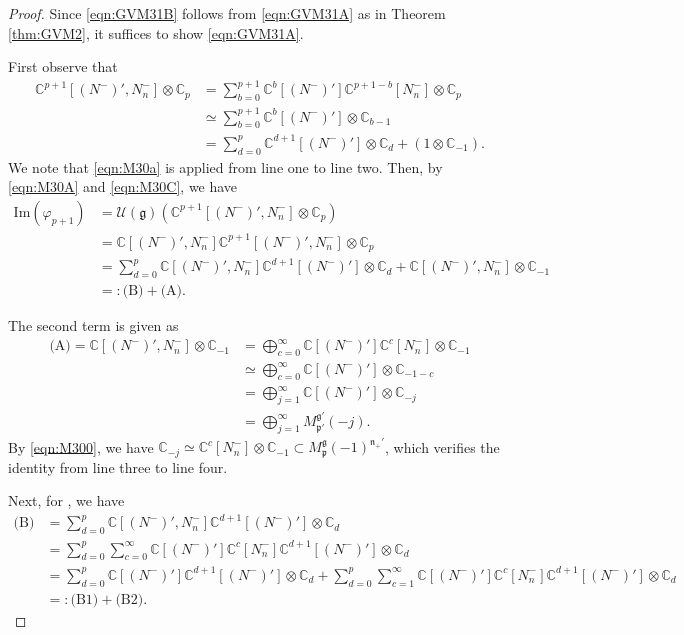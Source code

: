 \documentclass[reqno,11pt]{amsart}
\theoremstyle{remark}
\theoremstyle{definition}
\numberwithin{equation}{section}
\newcommand{\fg}{{\mathfrak g}}
\newcommand{\fn}{{\mathfrak n}}
\newcommand{\fp}{{\mathfrak p}}
\newcommand{\C}{\mathbb{C}}
\newcommand{\Cal}{\mathcal}
\renewcommand{\Im}{\mathrm{Im}}
\newcommand{\Mp}{M^{\fg}_{\fp}}
\newcommand{\Mpp}{M^{\fg'}_{\fp'}}
\newcommand{\Np}{(N^-)'}
\newcommand{\Nn}{N_n^-}
\begin{document}
\begin{proof}
Since \eqref{eqn:GVM31B} follows from \eqref{eqn:GVM31A}
as in Theorem \ref{thm:GVM2}, it suffices to show \eqref{eqn:GVM31A}.

First observe that
\begin{align}
\C^{p+1}[(N^-)', N_n^-]\otimes \C_p
&=\sum_{b=0}^{p+1}\C^b[\Np]\C^{p+1-b}[\Nn]\otimes \C_p \nonumber \\
&\simeq \sum_{b=0}^{p+1}\C^b[\Np]\otimes \C_{b-1} \nonumber \\
&=\sum_{d=0}^p \C^{d+1}[\Np] \otimes \C_d + (1\otimes \C_{-1}).
\label{eqn:M30C}
\end{align}
We note that \eqref{eqn:M30a} is applied from line one to line two.
Then, by \eqref{eqn:M30A} and \eqref{eqn:M30C}, we have
\begin{align}
\Im(\varphi_{p+1})
&=\Cal{U}(\fg)\left(\C^{p+1}[(N^-)', N_n^-] \otimes \C_p\right) \nonumber \\
&=\C[\Np,\Nn]\C^{p+1}[(N^-)', N_n^-] \otimes \C_p \nonumber \\
&=\sum_{d=0}^p \C[\Np,\Nn]\C^{d+1}[\Np] \otimes \C_d 
+ \C[\Np,\Nn]\otimes \C_{-1} \label{eqn:M30E}\\
&=: \text{(B)} + \text{(A)}.\label{eqn:M31A}
\end{align}

The second term  is given as
\begin{align}
\text{(A)}
= \C[\Np,\Nn]\otimes \C_{-1}
&=\bigoplus_{c=0}^\infty \C[\Np]\C^c[\Nn]\otimes \C_{-1} \nonumber\\
&\simeq \bigoplus_{c=0}^\infty\C[\Np]\otimes \C_{-1-c} \nonumber\\
&=\bigoplus_{j=1}^\infty\C[\Np]\otimes \C_{-j} \nonumber\\
&=\bigoplus_{j=1}^\infty\Mpp(-j).\label{eqn:M30F}
\end{align}
By \eqref{eqn:M300}, we have
$\C_{-j}\simeq \C^c[\Nn]\otimes \C_{-1} \subset \Mp(-1)^{\fn_+'}$,
which verifies the identity from line three to line four.

Next, for , we have 
\begin{align}
\text{(B)}
&=\sum_{d=0}^p \C[\Np,\Nn]\C^{d+1}[\Np] \otimes \C_d \nonumber \\
&=\sum_{d=0}^p\sum_{c=0}^\infty \C[\Np]\C^c[\Nn]\C^{d+1}[\Np]\otimes \C_d
\nonumber\\
&=\sum_{d=0}^p\C[\Np]\C^{d+1}[\Np]\otimes \C_d
+
\sum_{d=0}^p\sum_{c=1}^\infty \C[\Np]\C^c[\Nn]\C^{d+1}[\Np]\otimes \C_d
\nonumber \\
&=:\text{(B1)} + \text{(B2)}.\label{eqn:M30G}
\end{align}


\end{proof}
\end{document}
